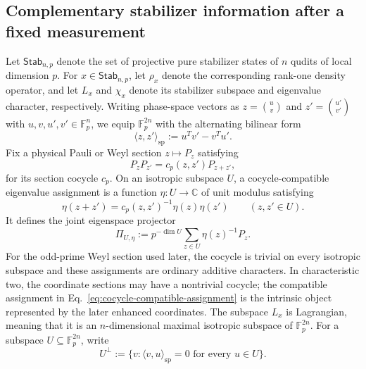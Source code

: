\documentclass[11pt]{article}
\newcommand{\F}{\mathbb F}
\newcommand{\1}{\mathbf 1}
\newcommand{\spair}[2]{\langle #1,#2\rangle_{\mathrm{sp}}}
\theoremstyle{plain}
\theoremstyle{definition}
\theoremstyle{remark}
\begin{document}
\subsection{Complementary stabilizer information after a fixed measurement}
\label{subsec:fixed-W-task}
\label{subsec:fixed-W-conditional-sufficiency}

Let $\mathsf{Stab}_{n,p}$ denote the set of projective pure stabilizer states
of $n$ qudits of local dimension $p$.  For $x\in\mathsf{Stab}_{n,p}$, let
$\rho_x$ denote the corresponding rank-one density operator, and let $L_x$
and $\chi_x$ denote its stabilizer subspace and eigenvalue character,
respectively.  
Writing phase-space vectors as $z=\binom{u}{v}$ and $z'=\binom{u'}{v'}$ with $u,v,u',v'\in\F_p^n$, we equip $\F_p^{2n}$ with the alternating bilinear form 
\begin{equation} 
\spair{z}{z'} :=u^Tv'-v^Tu'. \label{eq:global-symplectic-form} 
\end{equation} 
Fix a physical Pauli or Weyl section $z\mapsto P_z$ satisfying
\begin{equation}
 P_zP_{z'}=c_p(z,z')P_{z+z'},
 \label{eq:global-Pauli-section-cocycle}
\end{equation}
for its section cocycle $c_p$.  On an isotropic subspace $U$, a
cocycle-compatible eigenvalue assignment is a function $\eta:U\to\mathbb C$
of unit modulus satisfying
\begin{equation}
 \eta(z+z')=c_p(z,z')^{-1}\eta(z)\eta(z')
 \qquad(z,z'\in U).
 \label{eq:cocycle-compatible-assignment}
\end{equation}
It defines the joint eigenspace projector
\begin{equation}
 \Pi_{U,\eta}:=p^{-\dim U}\sum_{z\in U}\eta(z)^{-1}P_z.
 \label{eq:intrinsic-character-projector}
\end{equation}
For the odd-prime Weyl section used later, the cocycle is trivial on every
isotropic subspace and these assignments are ordinary additive characters.
In characteristic two, the coordinate sections may have a nontrivial cocycle;
the compatible assignment in Eq.~\eqref{eq:cocycle-compatible-assignment} is
the intrinsic object represented by the later enhanced coordinates.  The
subspace $L_x$ is Lagrangian, meaning that it is an $n$-dimensional maximal
isotropic subspace of $\F_p^{2n}$.  For a subspace
$U\subseteq\F_p^{2n}$, write
\begin{equation}
 U^\perp:=\{v:\spair{v}{u}=0\text{ for every }u\in U\}.
 \label{eq:symplectic-orthogonal-complement}
\end{equation}
\end{document}
